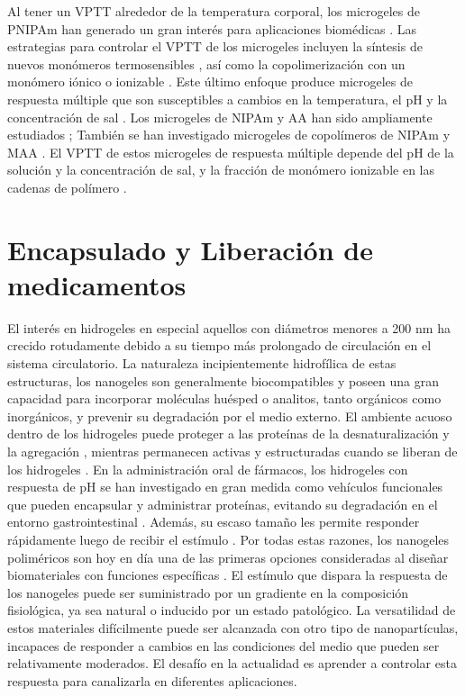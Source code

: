 Al tener un VPTT alrededor de la temperatura corporal, los microgeles de PNIPAm han generado un gran inter\'es para aplicaciones biom\'edicas \cite{Guan2011}.
Las estrategias para controlar el VPTT de los microgeles incluyen la s\'intesis de nuevos mon\'omeros termosensibles  \cite{Cai2007,Macchione2019}, as\'i como la copolimerizaci\'on con un mon\'omero i\'onico o ionizable  \cite{Hirose1987,Lopez2020}.
Este \'ultimo enfoque produce microgeles de respuesta m\'ultiple que son susceptibles a cambios en la temperatura, el pH y la concentraci\'on de sal  \cite{snowden1996colloidal, Farooqi2017}.
Los microgeles de NIPAm y AA han sido ampliamente estudiados \cite{Morris1997, Jones2000,Bradley2005,Begum2016};
Tambi\'en se han investigado microgeles de copol\'imeros de NIPAm y MAA  \cite{Dowding2000,Hoare2004,Giussi2015}.
El VPTT de estos microgeles de respuesta m\'ultiple depende del pH de la soluci\'on y la concentraci\'on de sal, y la fracci\'on de mon\'omero ionizable en las cadenas de pol\'imero  \cite{Morris1997,Jones2000, Hoare2004, Bradley2005, Lee2008,Wong2009,Hamzavi2016}.



\section{Encapsulado y Liberaci\'on de medicamentos}

El inter\'es en hidrogeles en especial aquellos con di\'ametros menores a 200 nm ha crecido rotudamente debido a su tiempo m\'as prolongado de circulaci\'on en el sistema circulatorio. La naturaleza incipientemente hidrof\'ilica de estas estructuras, los nanogeles son generalmente biocompatibles y poseen una gran capacidad para incorporar mol\'eculas hu\'esped o analitos, tanto org\'anicos como inorg\'anicos, y prevenir su degradaci\'on por el medio externo. El ambiente acuoso dentro de los hidrogeles puede proteger a las prote\'inas de la desnaturalizaci\'on y la agregaci\'on \cite{asayama2008comparison,sawada2010nano,beierle2014polymer}, mientras permanecen activas y estructuradas cuando se liberan de los hidrogeles \cite{vermonden2012hydrogels}. En la administraci\'on oral de f\'armacos, los hidrogeles con respuesta de pH se han investigado en gran medida como veh\'iculos funcionales que pueden encapsular y administrar prote\'inas, evitando su degradaci\'on en el entorno gastrointestinal \cite{malmsten2010biomacromolecules,renukuntla2013approaches,koetting2014ph}.
Adem\'as, su escaso tama\~no les permite responder r\'apidamente luego de recibir el est\'imulo \cite{tanaka1979kinetics} . Por todas estas razones, los nanogeles polim\'ericos son hoy en d\'ia una de las primeras opciones consideradas al dise\~nar biomateriales con funciones espec\'ificas \cite{soni2016nanogels, sabir2019polymeric}. El est\'imulo que dispara la respuesta de los nanogeles puede ser suministrado por un gradiente en la composici\'on fisiol\'ogica, ya sea natural o inducido por un estado patol\'ogico. La versatilidad de estos materiales dif\'icilmente puede ser alcanzada con otro tipo de nanopart\'iculas, incapaces de responder a cambios en las condiciones del medio que pueden ser relativamente moderados. El desaf\'io en la actualidad es aprender a controlar esta respuesta para canalizarla en diferentes aplicaciones.


